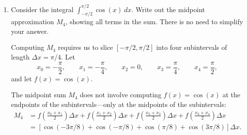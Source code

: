 \documentclass[main]{subfiles}
\begin{document}
\begin{enumerate}
\begin{solution}
        Based on the pictures and arguments above, we find that $L_n \leq I \leq R_n$ for an
        increasing function.  Notice that even though the pictures above show a concave down function, the arguments above did not rely on the concavity of the function at all. (In other words, the same argument could have been made for an increasing, concave up function.)  Thus, for both parts (a) and (b), the ordering should be $\boxed{L_n \leq I \leq R_n}$.
        
        We can use an almost identical argument with a decreasing function to show that the ordering for parts (c) and (d) should be $\boxed{R_n \leq I \leq L_n}$.
      \end{solution}


\pspace{\newpage}





\item 
  \begin{problem}[3in]
    Consider the integral $\displaystyle \int_{-\pi/2}^{\pi/2} \cos(x)~dx$.  Write
    out the midpoint approximation $M_{4}$, showing  
    all terms in the sum.  There is no need to simplify your answer.
  \end{problem}

  \begin{solution}
    Computing $M_4$ requires us to slice $[-\pi/2, \pi/2]$ into four subintervals
    of length $\Delta x = \pi/4$.  Let
    $$
      x_0 = -\frac{\pi}{2}, \qquad
      x_1 = -\frac{\pi}{4}, \qquad
      x_2 = 0, \qquad
      x_3 = \frac{\pi}{4}, \qquad
      x_4 = \frac{\pi}{2},
    $$
    and let $f(x) = \cos(x)$.    
    

    The midpoint sum $M_{4}$ does not involve computing $f(x) = \cos(x)$ at the
    endpoints of the subintervals---only at the midpoints of the subintervals:
    $$
      \begin{aligned}
      M_{4} & = f \left( \frac{x_0 + x_1}{2} \right) \Delta x +
                f \left( \frac{x_1 + x_2}{2} \right) \Delta x +
                f \left( \frac{x_2 + x_3}{2} \right) \Delta x +
                f \left( \frac{x_3 + x_4}{2} \right) \Delta x \\
            & = [ \cos (-3 \pi/8)  + \cos(- \pi/8)  +
                \cos(\pi/8)  + \cos(3 \pi/8) ] \Delta x.
      \end{aligned}
    $$


\end{solution}
\end{enumerate}
\end{document}
